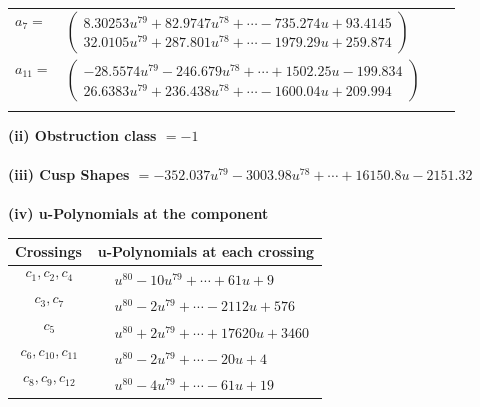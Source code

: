 \documentclass[1p]{elsarticle_modified}
\theoremstyle{definition}
\begin{document}
\begin{tabular}{m{7pt} m{180pt} m{7pt} m{180pt} }
\flushright $a_{7}=$&$\begin{pmatrix}8.30253 u^{79}+82.9747 u^{78}+\cdots-735.274 u+93.4145\\32.0105 u^{79}+287.801 u^{78}+\cdots-1979.29 u+259.874\end{pmatrix}$ \\
\flushright $a_{11}=$&$\begin{pmatrix}-28.5574 u^{79}-246.679 u^{78}+\cdots+1502.25 u-199.834\\26.6383 u^{79}+236.438 u^{78}+\cdots-1600.04 u+209.994\end{pmatrix}$\\&\end{tabular}
\flushleft \textbf{(ii) Obstruction class $= -1$}\\~\\
\flushleft \textbf{(iii) Cusp Shapes $= -352.037 u^{79}-3003.98 u^{78}+\cdots+16150.8 u-2151.32$}\\~\\
\newpage\renewcommand{\arraystretch}{1}
\flushleft \textbf{(iv) u-Polynomials at the component}\newline \\
\begin{tabular}{m{50pt}|m{274pt}}
Crossings & \hspace{64pt}u-Polynomials at each crossing \\
\hline $$\begin{aligned}c_{1},c_{2},c_{4}\end{aligned}$$&$\begin{aligned}
&u^{80}-10 u^{79}+\cdots+61 u+9
\end{aligned}$\\
\hline $$\begin{aligned}c_{3},c_{7}\end{aligned}$$&$\begin{aligned}
&u^{80}-2 u^{79}+\cdots-2112 u+576
\end{aligned}$\\
\hline $$\begin{aligned}c_{5}\end{aligned}$$&$\begin{aligned}
&u^{80}+2 u^{79}+\cdots+17620 u+3460
\end{aligned}$\\
\hline $$\begin{aligned}c_{6},c_{10},c_{11}\end{aligned}$$&$\begin{aligned}
&u^{80}-2 u^{79}+\cdots-20 u+4
\end{aligned}$\\
\hline $$\begin{aligned}c_{8},c_{9},c_{12}\end{aligned}$$&$\begin{aligned}
&u^{80}-4 u^{79}+\cdots-61 u+19
\end{aligned}$\\
\hline
\end{tabular}\\~\\
\end{document}
